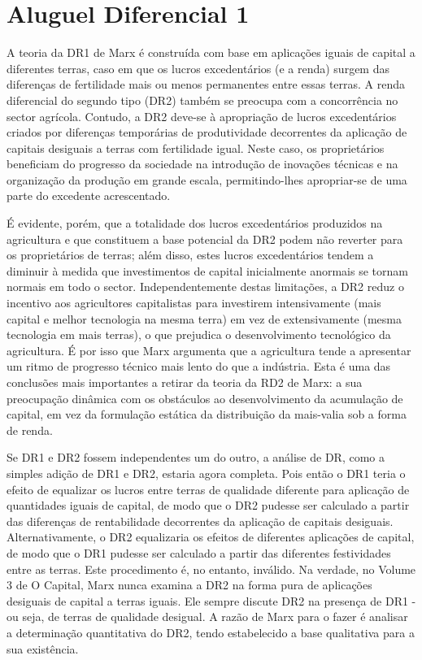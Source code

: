 \section{Aluguel Diferencial 1}
 \par 
A teoria da DR1 de Marx é construída com base em aplicações iguais de capital a diferentes terras, caso em que os lucros excedentários (e a renda) surgem das diferenças de fertilidade mais ou menos permanentes entre essas terras. A renda diferencial do segundo tipo (DR2) também se preocupa com a concorrência no sector agrícola. Contudo, a DR2 deve-se à apropriação de lucros excedentários criados por diferenças temporárias de produtividade decorrentes da aplicação de capitais desiguais a terras com fertilidade igual. Neste caso, os proprietários beneficiam do progresso da sociedade na introdução de inovações técnicas e na organização da produção em grande escala, permitindo-lhes apropriar-se de uma parte do excedente acrescentado.
 \par 
É evidente, porém, que a totalidade dos lucros excedentários produzidos na agricultura e que constituem a base potencial da DR2 podem não reverter para os proprietários de terras; além disso, estes lucros excedentários tendem a diminuir à medida que investimentos de capital inicialmente anormais se tornam normais em todo o sector. Independentemente destas limitações, a DR2 reduz o incentivo aos agricultores capitalistas para investirem intensivamente (mais capital e melhor tecnologia na mesma terra) em vez de extensivamente (mesma tecnologia em mais terras), o que prejudica o desenvolvimento tecnológico da agricultura. É por isso que Marx argumenta que a agricultura tende a apresentar um ritmo de progresso técnico mais lento do que a indústria. Esta é uma das conclusões mais importantes a retirar da teoria da RD2 de Marx: a sua preocupação dinâmica com os obstáculos ao desenvolvimento da acumulação de capital, em vez da formulação estática da distribuição da mais-valia sob a forma de renda.
 \par 
Se DR1 e DR2 fossem independentes um do outro, a análise de DR, como a simples adição de DR1 e DR2, estaria agora completa. Pois então o DR1 teria o efeito de equalizar os lucros entre terras de qualidade diferente para aplicação de quantidades iguais de capital, de modo que o DR2 pudesse ser calculado a partir das diferenças de rentabilidade decorrentes da aplicação de capitais desiguais. Alternativamente, o DR2 equalizaria os efeitos de diferentes aplicações de capital, de modo que o DR1 pudesse ser calculado a partir das diferentes festividades entre as terras. Este procedimento é, no entanto, inválido. Na verdade, no Volume {\color{blue}3} de O Capital, Marx nunca examina a DR2 na forma pura de aplicações desiguais de capital a terras iguais. Ele sempre discute DR2 na presença de DR1 - ou seja, de terras de qualidade desigual. A razão de Marx para o fazer é analisar a determinação quantitativa do DR2, tendo estabelecido a base qualitativa para a sua existência.
